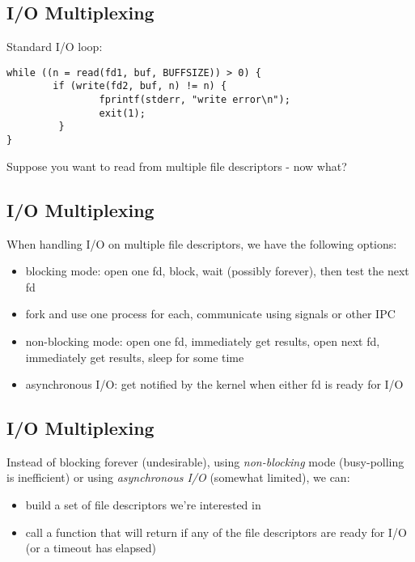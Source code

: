 \documentclass[xga]{xdvislides}
\begin{document}
\subsection{I/O Multiplexing}
Standard I/O loop:
\begin{verbatim}
while ((n = read(fd1, buf, BUFFSIZE)) > 0) {
        if (write(fd2, buf, n) != n) {
                fprintf(stderr, "write error\n");
                exit(1);
         }
}
\end{verbatim}

Suppose you want to read from multiple file descriptors - now what?



\subsection{I/O Multiplexing}
When handling I/O on multiple file descriptors, we have the following
options:

\begin{itemize}
	\item blocking mode: open one fd, block, wait (possibly forever),
		then test the next fd
	\item fork and use one process for each, communicate using signals
		or other IPC
	\item non-blocking mode: open one fd, immediately get results,
		open next fd, immediately get results, sleep for some time
	\item asynchronous I/O: get notified by the kernel when either fd
		is ready for I/O
\end{itemize}

\subsection{I/O Multiplexing}
Instead of blocking forever (undesirable), using {\em non-blocking} mode
(busy-polling is inefficient) or using {\em asynchronous I/O} (somewhat
limited), we can:
\begin{itemize}
	\item build a set of file descriptors we're interested in
	\item call a function that will return if any of the file
		descriptors are ready for I/O (or a timeout has elapsed)
\end{itemize}
\end{document}
